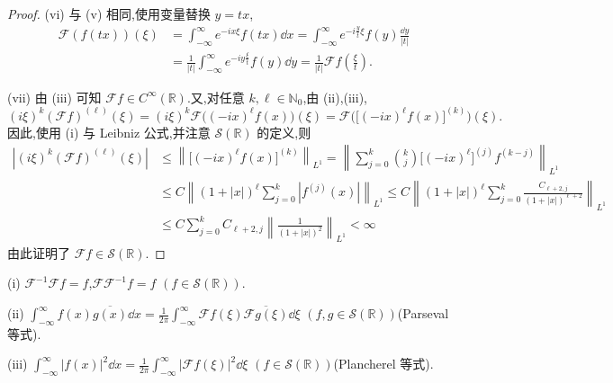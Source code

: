 \begin{proof}
(vi) 与 (v) 相同,使用变量替换 $y = tx$,
\begin{align*}
\mathcal{F}(f(tx))(\xi) & = \int_{-\infty}^{\infty} e^{-ix\xi}f(tx)\dd x = \int_{-\infty}^{\infty} e^{-i\frac{y}{t}\xi}f(y)\frac{\dd y}{|t|} \\
& = \frac{1}{|t|}\int_{-\infty}^{\infty} e^{-iy\frac{\xi}{t}}f(y)\dd y = \frac{1}{|t|}\mathcal{F}f\left(\frac{\xi}{t}\right).
\end{align*}

(vii) 由 (iii) 可知 $\mathcal{F}f \in C^{\infty}(\mathbb{R})$.又,对任意 $k, \ell \in \mathbb{N}_{0}$,由 (ii),(iii),
\begin{equation*}
(i\xi)^{k}(\mathcal{F}f)^{(\ell)}(\xi) = (i\xi)^{k}\mathcal{F}\bigl((-ix)^{\ell}f(x)\bigr)(\xi) = \mathcal{F}\bigl(\bigl[(-ix)^{\ell}f(x)\bigr]^{(k)}\bigr)(\xi).
\end{equation*}
因此,使用 (i) 与 Leibniz 公式,并注意 $\mathcal{S}(\mathbb{R})$ 的定义,则
\begin{align*}
|(i\xi)^{k}(\mathcal{F}f)^{(\ell)}(\xi)|&\leq \left\| \bigl[(-ix)^{\ell}f(x)\bigr]^{(k)} \right\|_{L^{1}} = \left\| \sum_{j=0}^{k}\binom{k}{j}\bigl[(-ix)^{\ell}\bigr]^{(j)}f^{(k-j)} \right\|_{L^{1}}  \\
&\leq C\left\| (1 + |x|)^{\ell}\sum_{j=0}^{k}|f^{(j)}(x)| \right\|_{L^{1}} \leq C\left\| (1 + |x|)^{\ell}\sum_{j=0}^{k}\frac{C_{\ell+2,j}}{(1 + |x|)^{\ell+2}} \right\|_{L^{1}} \\
&\leq C\sum_{j=0}^{k}C_{\ell+2,j}\left\| \frac{1}{(1 + |x|)^{2}} \right\|_{L^{1}} < \infty
\end{align*}
由此证明了 $\mathcal{F}f \in \mathcal{S}(\mathbb{R})$.
\end{proof}

\begin{theorem}\label{thm:1.2.9}
(i) $\mathcal{F}^{-1}\mathcal{F}f = f$,$\mathcal{F}\mathcal{F}^{-1}f = f$ $(f \in \mathcal{S}(\mathbb{R}))$.

(ii) $\int_{-\infty}^{\infty} f(x)\overline{g(x)}\dd x = \frac{1}{2\pi}\int_{-\infty}^{\infty}\mathcal{F}f(\xi)\overline{\mathcal{F}g(\xi)}\dd \xi$ $(f, g \in \mathcal{S}(\mathbb{R}))$(Parseval 等式).

(iii) $\int_{-\infty}^{\infty}|f(x)|^{2}\dd x = \frac{1}{2\pi}\int_{-\infty}^{\infty}|\mathcal{F}f(\xi)|^{2}\dd \xi$ $(f \in \mathcal{S}(\mathbb{R}))$(Plancherel 等式).
\end{theorem}

